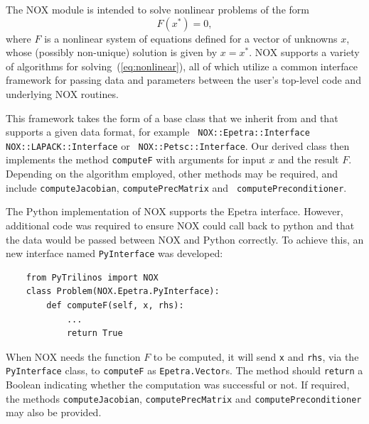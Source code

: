 \documentclass[acmtocl]{acmtrans2m}
\begin{document}
The NOX module is intended to solve nonlinear problems of the form
\begin{equation}
  \label{eq:nonlinear}
  F(x^*) = 0,
\end{equation}
where $F$ is a nonlinear system of equations defined for a vector of
unknowns $x$, whose (possibly non-unique) solution is given by
$x=x^*$.  NOX supports a variety of algorithms for
solving~(\ref{eq:nonlinear}), all of which utilize a common interface
framework for passing data and parameters between the user's top-level
code and underlying NOX routines.

This framework takes the form of a base class that we inherit from and
that supports a given data format, for example {\tt
  NOX::Epetra::Interface} {\tt NOX::LAPACK::Interface} or {\tt
  NOX::Petsc::Interface}.  Our derived class then implements the
method {\tt computeF} with arguments for input $x$ and the result $F$.
Depending on the algorithm employed, other methods may be required,
and include {\tt computeJacobian}, {\tt computePrecMatrix} and {\tt
  computePreconditioner}.

The Python implementation of NOX supports the Epetra interface.
However, additional code was required to ensure NOX could call back to
python and that the data would be passed between NOX and Python
correctly.  To achieve this, an new interface named {\tt PyInterface}
was developed:
\begin{verbatim}
    from PyTrilinos import NOX
    class Problem(NOX.Epetra.PyInterface):
        def computeF(self, x, rhs):
            ...
            return True
\end{verbatim}
When NOX needs the function $F$ to be computed, it will send {\tt x}
and {\tt rhs}, via the {\tt PyInterface} class, to {\tt computeF} as
{\tt Epetra.Vector}s.  The method should {\tt return} a Boolean
indicating whether the computation was successful or not.  If
required, the methods {\tt computeJacobian}, {\tt computePrecMatrix}
and {\tt computePreconditioner} may also be provided.
\end{document}
